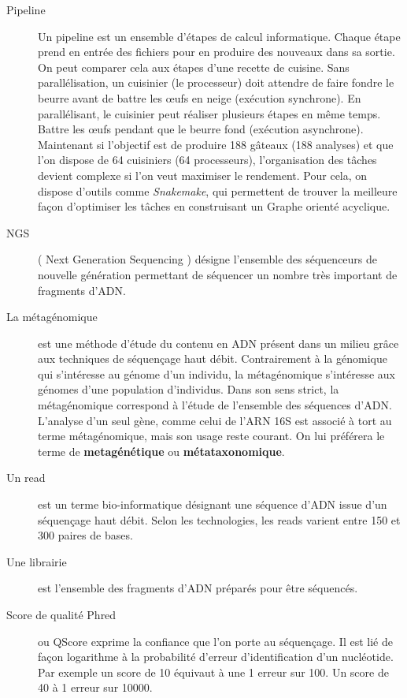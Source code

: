 \documentclass[12pt,a4paper]{article}
\begin{document}
\begin{description}
\item[Pipeline] 
Un pipeline est un ensemble d'étapes de calcul informatique. Chaque étape prend en entrée des fichiers pour en produire des nouveaux dans sa sortie. On peut comparer cela aux étapes d'une recette de cuisine. Sans parallélisation, un cuisinier (le processeur) doit attendre de faire fondre le beurre avant de battre les œufs en neige (exécution synchrone). En parallélisant, le cuisinier peut réaliser plusieurs étapes en même temps. Battre les œufs pendant que le beurre fond (exécution asynchrone). 
Maintenant si l'objectif est de produire 188 gâteaux (188 analyses) et que l'on dispose de 64 cuisiniers (64 processeurs), l'organisation des tâches devient complexe si l'on veut maximiser le rendement. Pour cela, on dispose d'outils comme \textit{Snakemake}\cite{Koster2012}, qui permettent de trouver la meilleure façon d'optimiser les tâches en construisant un Graphe orienté acyclique.

\item[NGS]( Next Generation Sequencing ) désigne l'ensemble des séquenceurs de nouvelle génération permettant de séquencer un nombre très important de fragments d'ADN. 

\item[La métagénomique] est une méthode d’étude du contenu en ADN présent dans un milieu grâce aux techniques de séquençage haut débit. Contrairement à la génomique qui s’intéresse au génome d’un individu, la métagénomique s’intéresse aux génomes d’une population d’individus.
Dans son sens strict, la métagénomique correspond à l’étude de l’ensemble des séquences d'ADN. L’analyse d’un seul gène, comme celui de l’ARN 16S est associé à tort au terme métagénomique, mais son usage reste courant. On lui préférera le terme de \textbf{metagénétique} ou \textbf{métataxonomique}.


\item[Un read] est un terme bio-informatique désignant une séquence d’ADN issue d’un séquençage haut débit. Selon les technologies, les reads varient entre 150 et 300 paires de bases.

\item[Une librairie] est l'ensemble des fragments d'ADN préparés pour être séquencés. 

\item[Score de qualité Phred] ou QScore exprime la confiance que l'on porte au séquençage. Il est lié de façon logarithme à la probabilité d'erreur d'identification d'un nucléotide.  Par exemple un score de 10 équivaut à une 1 erreur sur 100. Un score de 40 à 1 erreur sur 10000.



\end{description}
\end{document}
